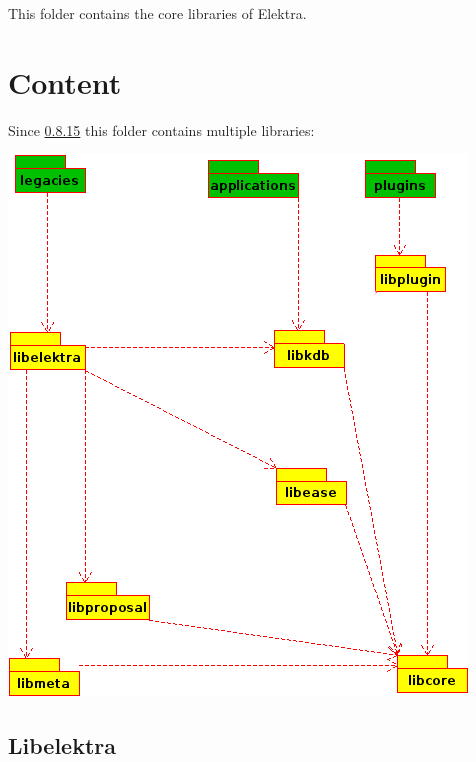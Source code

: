 This folder contains the core libraries of Elektra.\hypertarget{md_src_libs_elektra_README_src_libs_elektra_README_md}{}\section{Content}\label{md_src_libs_elektra_README_src_libs_elektra_README_md}
Since \mbox{\hyperlink{doc_decisions_library_split_md}{0.8.15}} this folder contains multiple libraries\+:


\begin{DoxyImage}
\includegraphics[width=\textwidth,height=\textheight/2,keepaspectratio=true]{overview_libs.png}
\end{DoxyImage}
\hypertarget{md_src_libs_elektra_README_autotoc_md1}{}\subsection{Libelektra}\label{md_src_libs_elektra_README_autotoc_md1}

\begin{DoxyCode}{0}
\end{DoxyCode}


